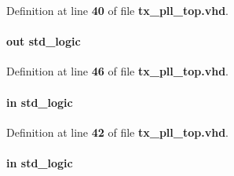 Definition at line {\bf 40} of file {\bf tx\+\_\+pll\+\_\+top.\+vhd}.

\paragraph[{pll\+\_\+locked}]{ {\bfseries \textcolor{keywordflow}{out}\textcolor{vhdlchar}{ }} {\bfseries \textcolor{comment}{std\+\_\+logic}\textcolor{vhdlchar}{ }} \hspace{0.3cm}{\ttfamily [Port]}}\label{classtx__pll__top_a20ad7319777025c5ed65a33f46e63e11}


Definition at line {\bf 46} of file {\bf tx\+\_\+pll\+\_\+top.\+vhd}.

\paragraph[{pll\+\_\+logic\+\_\+reset\+\_\+n}]{ {\bfseries \textcolor{keywordflow}{in}\textcolor{vhdlchar}{ }} {\bfseries \textcolor{comment}{std\+\_\+logic}\textcolor{vhdlchar}{ }} \hspace{0.3cm}{\ttfamily [Port]}}\label{classtx__pll__top_aaa326fc2a274fc920323383778c38860}


Definition at line {\bf 42} of file {\bf tx\+\_\+pll\+\_\+top.\+vhd}.

\paragraph[{rcnfg\+\_\+clk}]{ {\bfseries \textcolor{keywordflow}{in}\textcolor{vhdlchar}{ }} {\bfseries \textcolor{comment}{std\+\_\+logic}\textcolor{vhdlchar}{ }} \hspace{0.3cm}{\ttfamily [Port]}}\label{classtx__pll__top_aefb0e3a32f171ab0f0a94dfbc5ef3a3b}


